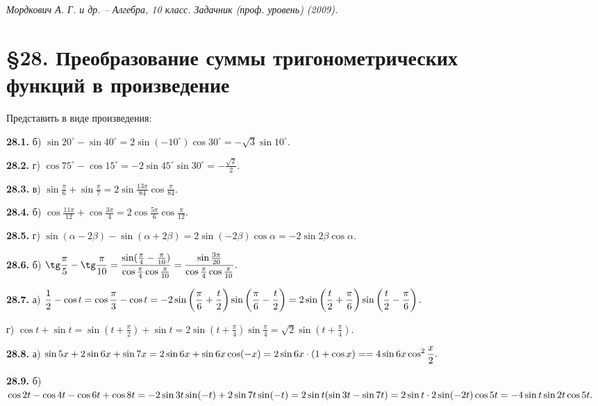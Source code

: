 \documentclass[a5paper,10pt]{article}
\begin{document}
{\it Мордкович А. Г. и др. -- Алгебра, 10 класс. Задачник (проф. уровень) (2009).}

\section*{\S 28. Преобразование суммы тригонометрических\\
функций в произведение}

\medskip
\noindent
Представить в виде произведения:

\medskip
\noindent
{\bf 28.1.} б) $\sin20^\circ-\sin40^\circ=2\sin(-10^\circ)\cos30^\circ=
-\sqrt3\sin10^\circ.$

\medskip
\noindent
{\bf 28.2.} г) $\displaystyle \cos75^\circ-\cos15^\circ=
-2\sin45^\circ\sin30^\circ=-\frac{\sqrt2}{2}.$

\medskip
\noindent
{\bf 28.3.} в) $\displaystyle \sin\frac{\pi}{6}+\sin\frac{\pi}{7}=
2\sin\frac{13\pi}{84}\cos\frac{\pi}{84}.$

\medskip
\noindent
{\bf 28.4.} б) $\displaystyle \cos\frac{11\pi}{12}+\cos\frac{3\pi}{4}=
2\cos\frac{5\pi}{6}\cos\frac{\pi}{12}.$

\medskip
\noindent
{\bf 28.5.} г) $\sin(\alpha-2\beta)-\sin(\alpha+2\beta)=
2\sin(-2\beta)\cos\alpha=-2\sin2\beta\cos\alpha.$

\medskip
\noindent
{\bf 28.6.} б) $\displaystyle \tg\frac{\pi}{5}-\tg\frac{\pi}{10}=
\frac{\sin(\frac{\pi}{4}-\frac{\pi}{10})}{\cos\frac{\pi}{4}\cos\frac{\pi}{10}}=
\frac{\sin\frac{3\pi}{20}}{\cos\frac{\pi}{4}\cos\frac{\pi}{10}}.$

\medskip
\noindent
{\bf 28.7.}
а) $\displaystyle \frac12-\cos t= \cos\frac{\pi}{3}-\cos t=
-2\sin\left(\frac{\pi}{6}+\frac{t}{2}\right)\sin\left(\frac{\pi}{6}-\frac{t}{2}\right)=\\
2\sin\left(\frac{t}{2}+\frac{\pi}{6}\right)\sin\left(\frac{t}{2}-\frac{\pi}{6}\right).$

\medskip
\noindent
г) $\displaystyle \cos t+\sin t=\sin\left(t+\frac{\pi}{2}\right)+\sin t=
2\sin\left(t+\frac{\pi}{4}\right)\sin\frac{\pi}{4}=\sqrt2\sin\left(t+\frac{\pi}{4}\right).$

\medskip
\noindent
{\bf 28.8.}
а) $\displaystyle \sin 5x+2\sin 6x+\sin 7x=2\sin 6x+\sin 6x\cos(-x)=2\sin 6x\cdot(1+\cos x)=\\[3pt]
=4\sin 6x \cos^2\frac{x}{2}.$

\medskip
\noindent
{\bf 28.9.}
б) $\cos 2t-\cos 4t-\cos 6t+\cos 8t=-2\sin 3t\sin(-t)+2\sin 7t\sin(-t)=\\
2\sin t(\sin 3t-\sin 7t)=2\sin t \cdot 2\sin(-2t) \cos 5t=-4\sin t \sin2t \cos 5t.$
\end{document}
